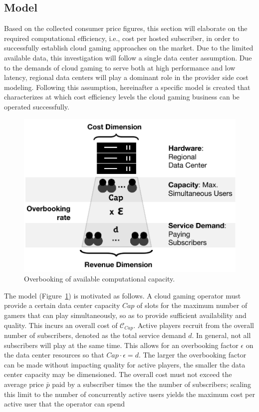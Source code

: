 \subsection{Model}

Based on the collected consumer price figures, this section will elaborate on the required computational efficiency, i.e., cost per hosted subscriber, in order to successfully establish cloud gaming approaches on the market. Due to the limited available data, this investigation will follow a single data center assumption. Due to the demands of cloud gaming to serve both at high performance and low latency, regional data centers will play a dominant role in the provider side cost modeling. Following this assumption, hereinafter a specific model is created that characterizes at which cost efficiency levels the cloud gaming business can be operated successfully.

\begin{figure}[!t]
	\centering
	\includegraphics[width=0.75\columnwidth]{images/overbooking_datacenterNG.pdf}
	\caption{Overbooking of available computational capacity.}
\label{fig:overbooking_datacenter}
\end{figure}

The model (Figure~\ref{fig:overbooking_datacenter}) is motivated as follows. A cloud gaming operator must provide a certain data center capacity $Cap$ of slots for the maximum number of gamers that can play simultaneously, so as to provide sufficient availability and quality. This incurs an overall cost of $\mathcal{C}_{Cap}$. Active players recruit from the overall number of subscribers, denoted as the total service demand $d$. In general, not all subscribers will play at the same time. This allows for an overbooking factor $\epsilon$ on the data center resources so that $Cap \cdot \epsilon = d$. The larger the overbooking factor can be made without impacting quality for active players, the smaller the data center capacity may be dimensioned. %
The overall cost must not exceed the average price $\bar{p}$ paid by a subscriber times the the number of subscribers;
scaling this limit to the number of concurrently active users yields the maximum cost per active user that the operator can spend

